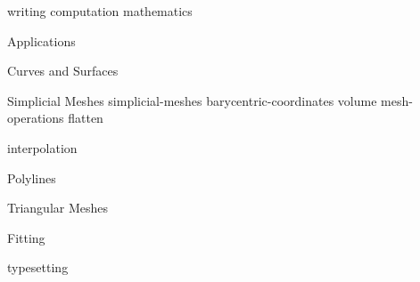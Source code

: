 \def\sharedFolder{../shared/}
{writing}
{computation}
{mathematics}
\begin{plSection}{Applications}
\begin{plSection}{Curves and Surfaces}
\begin{plSection}{Simplicial Meshes}
{simplicial-meshes}
{barycentric-coordinates}
{volume}
{mesh-operations}
{flatten}
\end{plSection}%
{interpolation}
\begin{plSection}{Polylines}
\end{plSection}%
\begin{plSection}{Triangular Meshes}
\end{plSection}%
\begin{plSection}{Fitting}
\end{plSection} %
\end{plSection} %
\end{plSection}%
{typesetting}
